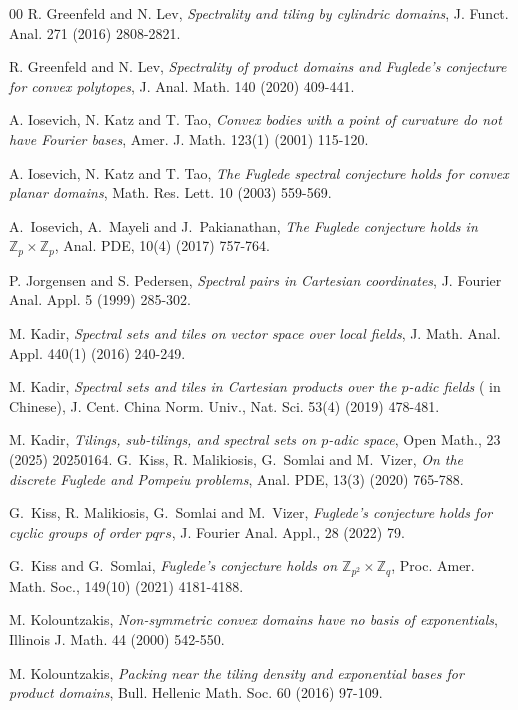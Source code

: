 \documentclass[a4paper,12pt]{amsart}
\begin{document}
\begin{thebibliography}{00}
R. Greenfeld and N. Lev, {\em Spectrality and tiling by cylindric domains}, J. Funct. Anal. 271 (2016) 2808-2821.

R. Greenfeld and N. Lev, {\em Spectrality of product domains and Fuglede's conjecture for convex polytopes},
J. Anal. Math. 140 (2020) 409-441.


 A. Iosevich, N. Katz and T. Tao, {\em Convex bodies with a point of curvature do not have Fourier bases},
Amer. J. Math. 123(1) (2001) 115-120.

A. Iosevich, N. Katz and T. Tao, {\em The Fuglede spectral conjecture holds for
convex planar domains},  Math. Res. Lett. 10 (2003) 559-569.

A.~Iosevich, A.~Mayeli and J.~Pakianathan,
{\em The Fuglede conjecture holds in $\mathbb{Z}_p\times\mathbb{Z}_p$},
 Anal. PDE, 10(4) (2017) 757-764.


 P. Jorgensen and S. Pedersen,
{\em Spectral pairs in Cartesian coordinates},  J. Fourier Anal. Appl. 5 (1999) 285-302.

M. Kadir, {\em Spectral sets and tiles on vector space over local fields},
J. Math. Anal. Appl. 440(1) (2016) 240-249.

M. Kadir, {\em Spectral sets and tiles in Cartesian products over the $p$-adic fields} ( in Chinese),
J. Cent. China Norm. Univ., Nat. Sci. 53(4) (2019) 478-481.

M. Kadir, {\em Tilings, sub-tilings, and spectral sets on $p$-adic space}, Open
Math., 23 (2025)  20250164.
G.~Kiss, R. Malikiosis, G.~Somlai and M.~Vizer, {\em On the discrete Fuglede and Pompeiu problems},
 Anal. PDE, 13(3) (2020) 765-788.

G.~Kiss, R. Malikiosis, G.~Somlai and M.~Vizer,
{\em Fuglede's conjecture holds for cyclic groups of order $pqrs$},
 J. Fourier Anal. Appl., 28 (2022) 79.

G.~Kiss and G.~Somlai,
{\em Fuglede's conjecture holds on $\mathbb{Z}_{p^2}\times\mathbb{Z}_q$},
 Proc. Amer. Math. Soc., 149(10) (2021) 4181-4188.

M. Kolountzakis, {\em Non-symmetric convex domains have no basis of exponentials}, Illinois J. Math. 44 (2000) 542-550.

M. Kolountzakis, {\em Packing near the tiling density and exponential bases for product domains},
Bull. Hellenic Math. Soc. 60 (2016) 97-109.


\end{thebibliography}
\end{document}

